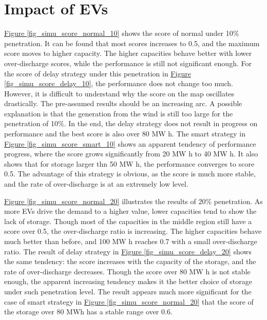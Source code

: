 \documentclass[12pt,a4paper]{report}
\begin{document}
        \section{Impact of EVs}

        \hyperref[fig_simu_score_normal_10]{Figure \ref*{fig_simu_score_normal_10}} shows the score of normal under 10\% penetration. It can be found that most scores increases to 0.5, and the maximum score moves to higher capacity. The higher capacities behave better with lower over-discharge scores, while the performance is still not significant enough.
        For the score of delay strategy under this penetration in \hyperref[fig_simu_score_delay_10]{Figure \ref*{fig_simu_score_delay_10}}, the performance does not change too much. However, it is difficult to understand why the score on the map oscillates drastically. The pre-assumed results should be an increasing arc. A possible explanation is that the generation from the wind is still too large for the penetration of 10\%. In the end, the delay strategy does not result in progress on performance and the best score is also over 80 MW h.
        The smart strategy in \hyperref[fig_simu_score_smart_10]{Figure \ref*{fig_simu_score_smart_10}} shows an apparent tendency of performance progress, where the score grows significantly from 20 MW h to 40 MW h. It also shows that for storage larger thn 50 MW h, the performance converges to score 0.5. The advantage of this strategy is obvious, as the score is much more stable, and the rate of over-discharge is at an extremely low level.

        \hyperref[fig_simu_score_normal_20]{Figure \ref*{fig_simu_score_normal_20}} illustrates the results of 20\% penetration. As more EVs drive the demand to a higher value, lower capacities tend to show the lack of storage. Though most of the capacities in the middle region still have a score over 0.5, the over-discharge ratio is increasing. The higher capacities behave much better than before, and 100 MW h reaches 0.7 with a small over-discharge ratio.
        The result of delay strategy in \hyperref[fig_simu_score_delay_20]{Figure \ref*{fig_simu_score_delay_20}} shows the same tendency: the score increases with the capacity of the storage, and the rate of over-discharge decreases. Though the score over 80 MW h is not stable enough, the apparent increasing tendency makes it the better choice of storage under such penetration level.
        The result appears much more significant for the case of smart strategy in \hyperref[fig_simu_score_normal_20]{Figure \ref*{fig_simu_score_normal_20}} that the score of the storage over 80 MWh has a stable range over 0.6.
            
\end{document}
